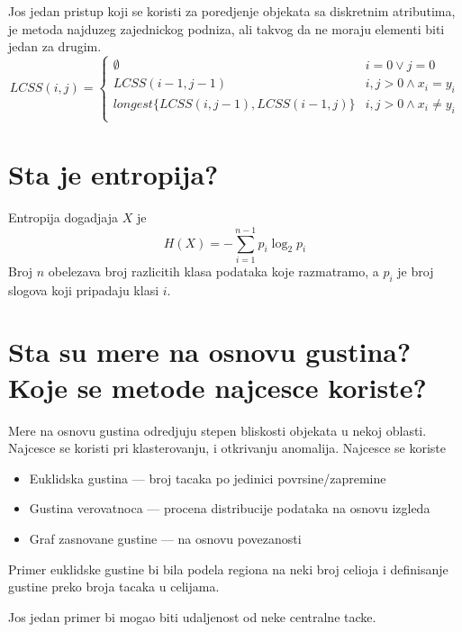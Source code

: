 \documentclass[a4paper]{article}
\begin{document}
Jos jedan pristup koji se koristi za poredjenje objekata sa diskretnim atributima, je metoda
najduzeg zajednickog podniza, ali takvog da ne moraju elementi biti jedan za drugim.
\[
    LCSS(i, j) =
    \begin{cases}
        \emptyset & i = 0 \lor j = 0 \\
        LCSS(i-1, j-1) & i,j > 0 \land x_i = y_i \\
        longest\{LCSS(i, j-1), LCSS(i-1, j)\} & i,j > 0 \land x_i \neq y_i \\
    \end{cases}
\]

\section{Sta je entropija?}
Entropija dogadjaja \(X\) je
\[
    H(X) = - \sum_{i=1}^{n-1}p_i\log_{2}p_i
\]
Broj \(n\) obelezava broj razlicitih klasa podataka koje razmatramo, a \(p_i\) je broj slogova
koji pripadaju klasi \(i\).

\section{Sta su mere na osnovu gustina? Koje se metode najcesce koriste?}
Mere na osnovu gustina odredjuju stepen bliskosti objekata u nekoj oblasti. Najcesce se koristi pri
klasterovanju, i otkrivanju anomalija. Najcesce se koriste
\begin{itemize}
        \item Euklidska gustina --- broj tacaka po jedinici povrsine/zapremine
        \item Gustina verovatnoca --- procena distribucije podataka na osnovu izgleda
        \item Graf zasnovane gustine --- na osnovu povezanosti
\end{itemize}
Primer euklidske gustine bi bila podela regiona na neki broj celioja i definisanje gustine preko
broja tacaka u celijama.

Jos jedan primer bi mogao biti udaljenost od neke centralne tacke.
\end{document}

